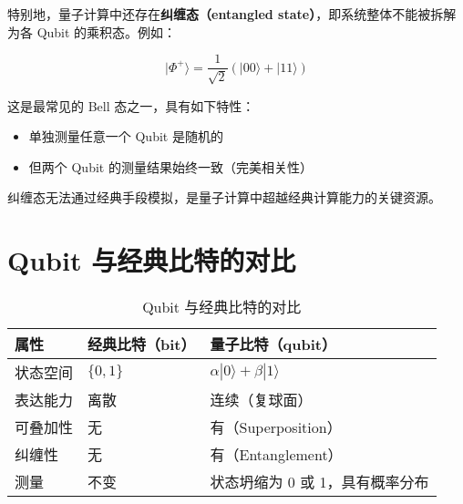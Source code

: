 \documentclass[12pt]{article}
\begin{document}
特别地，量子计算中还存在\textbf{纠缠态（entangled state）}，即系统整体不能被拆解为各 Qubit 的乘积态。例如：

\[
|\Phi^+\rangle = \frac{1}{\sqrt{2}} (|00\rangle + |11\rangle)
\]

这是最常见的 Bell 态之一，具有如下特性：
\begin{itemize}
    \item 单独测量任意一个 Qubit 是随机的
    \item 但两个 Qubit 的测量结果始终一致（完美相关性）
\end{itemize}

纠缠态无法通过经典手段模拟，是量子计算中超越经典计算能力的关键资源。

\section{Qubit 与经典比特的对比}

\begin{table}[H]
\centering
\begin{tabular}{@{}lll@{}}
\toprule
\textbf{属性} & \textbf{经典比特（bit）} & \textbf{量子比特（qubit）} \\ \midrule
状态空间 & $\{0, 1\}$ & $\alpha|0\rangle + \beta|1\rangle$ \\
表达能力 & 离散 & 连续（复球面） \\
可叠加性 & 无 & 有（Superposition） \\
纠缠性 & 无 & 有（Entanglement） \\
测量 & 不变 & 状态坍缩为 0 或 1，具有概率分布 \\ \bottomrule
\end{tabular}
\caption{Qubit 与经典比特的对比}
\end{table}
\end{document}

